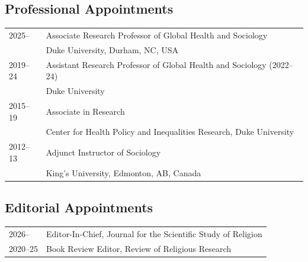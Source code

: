 \vspace{4ex}
\subsection*{Professional Appointments}
\begin{longtable}{p{} p{}}
2025-- & Associate Research Professor of Global Health and Sociology\\
				& Duke University, Durham, NC, USA \\

2019--24 & Assistant Research Professor of Global Health and Sociology (2022--24)\\
		             & Duke University\\
		             
2015--19 & Associate in Research\\
& Center for Health Policy and Inequalities Research, Duke University\\

2012--13 & Adjunct Instructor of Sociology\\
	& King's University, Edmonton, AB, Canada\\
\end{longtable}

\subsection*{Editorial Appointments}
\begin{longtable}{p{} p{}}
2026-- & Editor-In-Chief, Journal for the Scientific Study of Religion\\

2020--25 & Book Review Editor, Review of Religious Research\\
\end{longtable}

